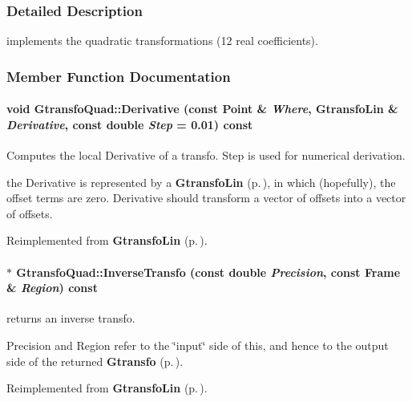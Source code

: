 \subsubsection{Detailed Description}
implements the quadratic transformations (12 real coefficients).



\subsubsection{Member Function Documentation}
\paragraph{\setlength{\rightskip}{0pt plus 5cm}void Gtransfo\-Quad::Derivative (const {\bf Point} \& {\em Where}, {\bf Gtransfo\-Lin} \& {\em Derivative}, const double {\em Step} = 0.01) const\hspace{0.3cm}{\tt  [virtual]}}\hfill\label{class_gtransfoquad_a9}


Computes the local Derivative of a transfo. Step is used for numerical derivation.

the Derivative is represented by a {\bf Gtransfo\-Lin} {\rm (p.\,\pageref{class_gtransfolin})}, in which (hopefully), the offset terms are zero. Derivative should  transform a vector of offsets into a vector of offsets. 

Reimplemented from {\bf Gtransfo\-Lin} {\rm (p.\,\pageref{class_gtransfolin_a5})}.
\paragraph{$\ast$ Gtransfo\-Quad::Inverse\-Transfo (const double {\em Precision}, const {\bf Frame} \& {\em Region}) const\hspace{0.3cm}{\tt  [virtual]}}\hfill\label{class_gtransfoquad_a8}


returns an inverse transfo.

Precision and Region refer to the \char`\"{}input\char`\"{} side of this,  and hence to the output side of the returned {\bf Gtransfo} {\rm (p.\,\pageref{class_gtransfo})}. 

Reimplemented from {\bf Gtransfo\-Lin} {\rm (p.\,\pageref{class_gtransfolin_a14})}.
